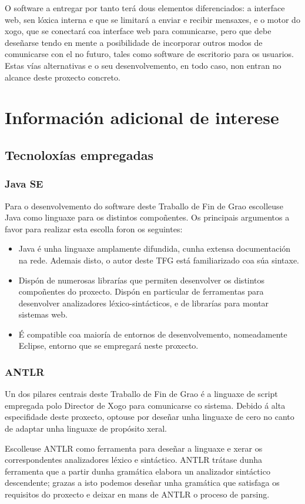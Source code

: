 O software a entregar por tanto terá dous elementos diferenciados: a interface
web, sen lóxica interna e que se limitará a enviar e recibir mensaxes, e o
motor do xogo, que se conectará coa interface web para comunicarse, pero que
debe deseñarse tendo en mente a posibilidade de incorporar outros modos de
comunicarse con el no futuro, tales como software de escritorio para os
usuarios. Estas vías alternativas e o seu desenvolvemento, en todo caso, non
entran no alcance deste proxecto concreto.

\section{Información adicional de interese}
\subsection{Tecnoloxías empregadas}

\subsubsection{Java SE}
Para o desenvolvemento do software deste Traballo de Fin de Grao escolleuse Java
como linguaxe para os distintos compoñentes.
Os principais argumentos a favor para realizar esta escolla foron os seguintes:
\begin{itemize}
  \item Java é unha linguaxe amplamente difundida, cunha extensa documentación
  na rede. Ademais disto, o autor deste TFG está familiarizado coa súa sintaxe.
  \item Dispón de numerosas librarías que permiten desenvolver os distintos
  compoñentes do proxecto. Dispón en particular de ferramentas para desenvolver
  analizadores léxico-sintácticos, e de librarías para montar sistemas web.
  \item É compatible coa maioría de entornos de desenvolvemento, nomeadamente
  Eclipse, entorno que se empregará neste proxecto.
\end{itemize}

\subsubsection{ANTLR}
Un dos pilares centrais deste Traballo de Fin de Grao é a linguaxe de script
empregada polo Director de Xogo para comunicarse co sistema. Debido á alta
especifidade deste proxecto, optouse por deseñar unha linguaxe de
cero no canto de adaptar unha linguaxe de propósito xeral.
\par
Escolleuse ANTLR como ferramenta para deseñar a linguaxe e xerar os
correspondentes analizadores léxico e sintáctico. ANTLR trátase dunha ferramenta
que a partir dunha gramática elabora un analizador sintáctico descendente;
grazas a isto podemos deseñar unha gramática que satisfaga os requisitos do
proxecto e deixar en mans de ANTLR o proceso de parsing.

